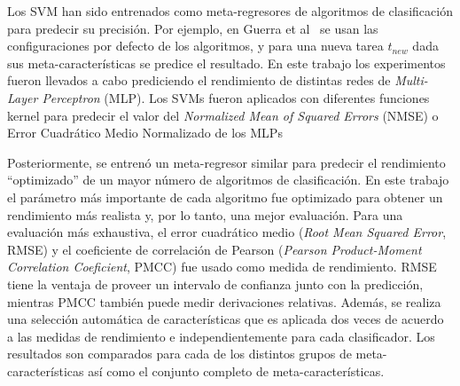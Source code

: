Los SVM han sido entrenados como meta-regresores de algoritmos de clasificación para predecir su precisión. Por ejemplo, en Guerra et al~\cite{guerra2008predicting} se usan las configuraciones por defecto de los algoritmos, y para una nueva tarea $t_{new}$ dada sus meta-características se predice el resultado. En este trabajo los experimentos fueron llevados a cabo prediciendo el rendimiento de distintas redes de \textit{Multi-Layer Perceptron} (MLP). Los SVMs fueron aplicados con diferentes funciones kernel para predecir el valor del \textit{Normalized Mean of Squared Errors} (NMSE) o Error Cuadrático Medio Normalizado de los MLPs

Posteriormente, se entrenó un meta-regresor similar \cite{reif2012automatic} para predecir el rendimiento ``optimizado'' de un mayor número de algoritmos de clasificación. En este trabajo el parámetro más importante de cada algoritmo fue optimizado para obtener un rendimiento más realista y, por lo tanto, una mejor evaluación. Para una evaluación más exhaustiva, el error cuadrático medio (\textit{Root Mean Squared Error}, RMSE) y el coeficiente de correlación de Pearson (\textit{Pearson Product-Moment Correlation Coeficient}, PMCC) fue usado como medida de rendimiento. RMSE tiene la ventaja de proveer un intervalo de confianza junto con la predicción, mientras PMCC también puede medir derivaciones relativas. Además, se realiza una selección automática de características que es aplicada dos veces de acuerdo a las medidas de rendimiento e independientemente para cada clasificador. Los resultados son comparados para cada de los distintos grupos de meta-características así como el conjunto completo de meta-características.

%
%
%
%

